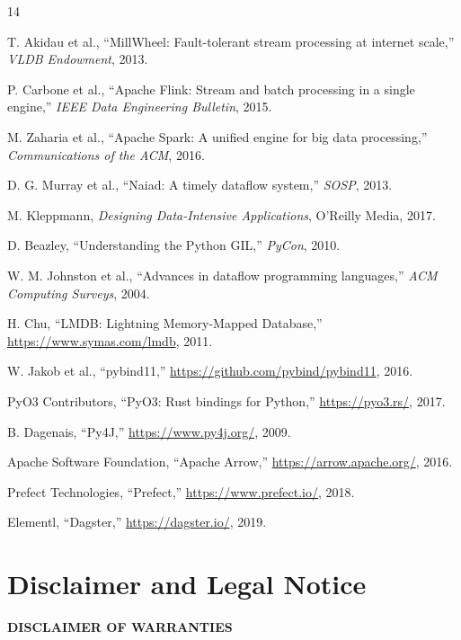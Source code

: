 \documentclass[11pt,a4paper]{article}
\begin{document}
\begin{thebibliography}{14}

T. Akidau et al., ``MillWheel: Fault-tolerant stream processing at internet scale,'' \textit{VLDB Endowment}, 2013.

P. Carbone et al., ``Apache Flink: Stream and batch processing in a single engine,'' \textit{IEEE Data Engineering Bulletin}, 2015.

M. Zaharia et al., ``Apache Spark: A unified engine for big data processing,'' \textit{Communications of the ACM}, 2016.

D. G. Murray et al., ``Naiad: A timely dataflow system,'' \textit{SOSP}, 2013.

M. Kleppmann, \textit{Designing Data-Intensive Applications}, O'Reilly Media, 2017.

D. Beazley, ``Understanding the Python GIL,'' \textit{PyCon}, 2010.

W. M. Johnston et al., ``Advances in dataflow programming languages,'' \textit{ACM Computing Surveys}, 2004.

H. Chu, ``LMDB: Lightning Memory-Mapped Database,'' \url{https://www.symas.com/lmdb}, 2011.

W. Jakob et al., ``pybind11,'' \url{https://github.com/pybind/pybind11}, 2016.

PyO3 Contributors, ``PyO3: Rust bindings for Python,'' \url{https://pyo3.rs/}, 2017.

B. Dagenais, ``Py4J,'' \url{https://www.py4j.org/}, 2009.

Apache Software Foundation, ``Apache Arrow,'' \url{https://arrow.apache.org/}, 2016.

Prefect Technologies, ``Prefect,'' \url{https://www.prefect.io/}, 2018.

Elementl, ``Dagster,'' \url{https://dagster.io/}, 2019.

\end{thebibliography}

\section*{Disclaimer and Legal Notice}

\textbf{DISCLAIMER OF WARRANTIES}
\end{document}
